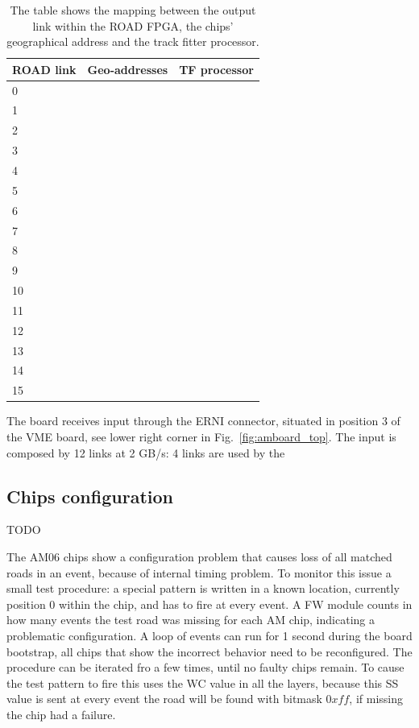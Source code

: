 \begin{table}
	\centering
	\begin{tabular}{|l|l|l|}
		\hline
		\textbf{ROAD link} & \textbf{Geo-addresses} & \textbf{TF processor} \\
		\hline\hline
		0 & & \\
		1 & & \\
		2 & & \\
		3 & & \\
		\hline
		4 & & \\
		5 & & \\
		6 & & \\
		7 & & \\
		\hline
		8 & & \\
		9 & & \\
		10 & & \\
		11 & & \\
		\hline
		12 & & \\
		13 & & \\
		14 & & \\
		15 & & \\
		\hline
	\end{tabular}
	
	\caption{The table shows the mapping between the output link within the
		ROAD FPGA, the chips' geographical address and the track fitter processor.}
\end{table}
The board receives input through the ERNI connector, situated in position 3 of the
VME board, see lower right corner in Fig.~\ref{fig:amboard_top}. The input
is composed by 12 links at 2 GB/s: 4 links are used by the 

\subsection{Chips configuration}
\label{sec:chipconfig}
 TODO
 
The AM06 chips show a configuration problem that causes loss of all matched
roads in an event, because of internal timing problem. To monitor this issue a
small test procedure: a special pattern is written in a known location, currently
position 0 within the chip, and has to fire at every event. A FW module counts in
how many events the test road was missing for each AM chip, indicating a problematic
configuration.
A loop of events can run for 1 second during the board 
bootstrap, all chips that show the incorrect behavior need to be reconfigured.
The procedure can be iterated fro a few times, until no faulty chips remain.
To cause the test pattern to fire this uses the WC value in all the layers,
because this SS value is sent at every event the road will be found with bitmask
$0xff$, if missing the chip had a failure.
 
